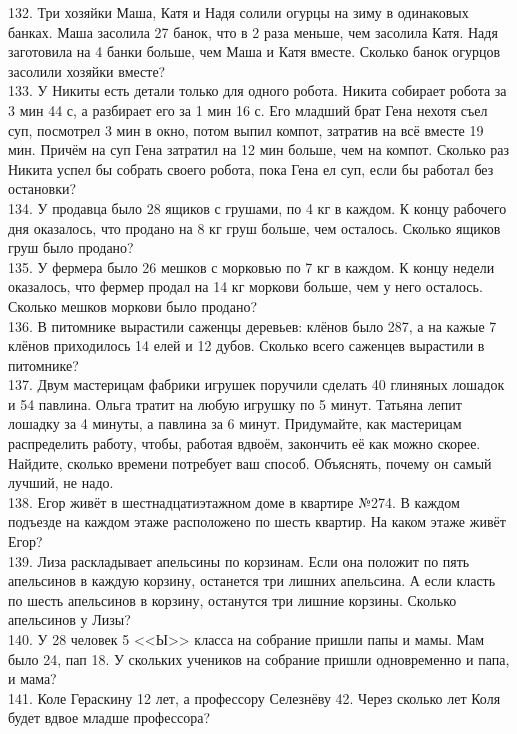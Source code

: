 \documentclass[12pt]{article}
\begin{document}
132. Три хозяйки Маша, Катя и Надя солили огурцы на зиму в одинаковых банках. Маша засолила 27 банок, что в 2 раза меньше, чем засолила Катя. Надя заготовила на 4 банки больше, чем Маша и Катя вместе. Сколько банок огурцов засолили хозяйки вместе?\\
133. У Никиты есть детали только для одного робота. Никита собирает робота за 3 мин 44 с, а разбирает его за 1 мин 16 с. Его младший брат Гена нехотя съел суп, посмотрел 3 мин в окно, потом выпил компот, затратив на всё вместе 19 мин. Причём на суп Гена затратил на 12 мин больше, чем на компот. Сколько раз Никита успел бы собрать своего робота, пока Гена ел суп, если бы работал без остановки?\\
134. У продавца было 28 ящиков с грушами, по 4 кг в каждом. К концу рабочего дня оказалось, что продано на 8 кг груш больше, чем осталось. Сколько ящиков груш было продано?\\
135. У фермера было 26 мешков с морковью по 7 кг в каждом. К концу недели оказалось, что фермер продал на 14 кг моркови больше, чем у него осталось. Сколько мешков моркови было продано?\\
136. В питомнике вырастили саженцы деревьев: клёнов было 287, а на кажые 7 клёнов приходилось 14 елей и 12 дубов. Сколько всего саженцев вырастили в питомнике?\\
137. Двум мастерицам фабрики игрушек поручили сделать 40 глиняных лошадок и 54 павлина. Ольга тратит на любую игрушку по 5 минут. Татьяна лепит лошадку за 4 минуты, а павлина за 6 минут. Придумайте, как мастерицам распределить работу, чтобы, работая вдвоём, закончить её как можно скорее. Найдите, сколько времени потребует ваш способ. Объяснять, почему он самый лучший, не надо.\\
138. Егор живёт в шестнадцатиэтажном доме в квартире №274. В каждом подъезде на каждом этаже расположено по шесть квартир. На каком этаже живёт Егор?\\
139. Лиза раскладывает апельсины по корзинам. Если она положит по пять апельсинов в каждую корзину, останется три лишних апельсина. А если класть по шесть апельсинов в корзину, останутся три лишние корзины. Сколько апельсинов у Лизы?\\
140. У 28 человек 5 <<Ы>> класса на собрание пришли папы и мамы. Мам было 24, пап 18. У скольких учеников на собрание пришли одновременно и папа, и мама?\\
141. Коле Гераскину 12 лет, а профессору Селезнёву 42. Через сколько лет Коля будет вдвое младше профессора?\\
\end{document}
